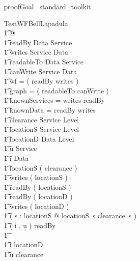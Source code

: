\begin{zsection}	 \SECTION proofGoal \parents~standard\_toolkit
\end{zsection}

 

\begin{theorem}{ Test}\forall WFBellLapadula \\
    \t1 @ \\
    \t1 readBy \in Data \rel Service \land \\
      \t1 writes \in Service \rel Data \land \\
      \t1 readableTo \in Data \rel Service \land \\
      \t1 canWrite \in Service \rel Data \land \\
      \t1 wf = ( readBy \comp writes ) \plus \land \\
      \t1 graph = ( readableTo \comp canWrite ) \plus \land \\
      \t1 knownServices = \dom writes \cup \ran readBy \land \\
      \t1 knownData = \dom readBy \cup \ran writes \land \\
      \t1 clearance \in Service \pfun Level \land \\
      \t1 locationS \in Service \pfun Level \land \\
      \t1 locationD \in Data \pfun Level \land \\
      \t1 u \in Service \land \\
      \t1 i \in Data \land \\
      \t1 \dom locationS \in \power ( \dom clearance ) \land \\
      \t1 \dom writes \in \power ( \dom locationS ) \land \\
      \t1 \ran readBy \in \power ( \dom locationS ) \land \\
      \t1 \dom readBy \in \power ( \dom locationD ) \land \\
      \t1 \ran writes \in \power ( \dom locationD ) \land \\
      \t1 ( \forall s : \dom locationS @ locationS~s \leq clearance~s ) \land \\
      \t1 ( i , u ) \in readBy \\
     \t1 \implies \\
     \t1 i \in \dom locationD \land \\
      \t1 u \in \dom clearance
\end{theorem}

 
